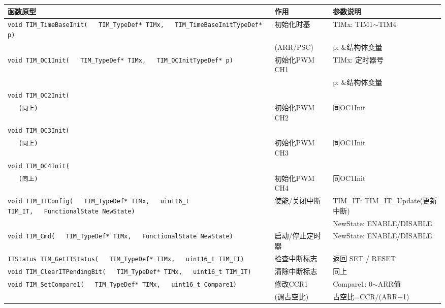 \documentclass[10pt,a4paper,oneside]{ctexart}
\begin{document}
\begin{center}
\begin{tabular}{@{}p{5.5cm}p{2.2cm}p{3.3cm}@{}}
    \toprule
    \textbf{函数原型} & \textbf{作用} & \textbf{参数说明} \\
    \midrule
    \texttt{void TIM\_TimeBaseInit(}\newline\texttt{~~~TIM\_TypeDef* TIMx,}\newline\texttt{~~~TIM\_TimeBaseInitTypeDef* p)} & 初始化时基 & TIMx: TIM1$\sim$TIM4 \\
     & (ARR/PSC) & p: \&结构体变量 \\
    \midrule
    \texttt{void TIM\_OC1Init(}\newline\texttt{~~~TIM\_TypeDef* TIMx,}\newline\texttt{~~~TIM\_OCInitTypeDef* p)} & 初始化PWM CH1 & TIMx: 定时器号 \\
     &  & p: \&结构体变量 \\
    \midrule
    \texttt{void TIM\_OC2Init(}\\\texttt{~~~(同上)} & 初始化PWM CH2 & 同OC1Init \\
    \texttt{void TIM\_OC3Init(}\\\texttt{~~~(同上)} & 初始化PWM CH3 & 同OC1Init \\
    \texttt{void TIM\_OC4Init(}\\\texttt{~~~(同上)} & 初始化PWM CH4 & 同OC1Init \\
    \midrule
    \texttt{void TIM\_ITConfig(}\newline\texttt{~~~TIM\_TypeDef* TIMx,}\newline\texttt{~~~uint16\_t TIM\_IT,}\newline\texttt{~~~FunctionalState NewState)} & 使能/关闭中断 & TIM\_IT: TIM\_IT\_Update(更新中断) \\
     &  & NewState: ENABLE/DISABLE \\
    \midrule
    \texttt{void TIM\_Cmd(}\newline\texttt{~~~TIM\_TypeDef* TIMx,}\newline\texttt{~~~FunctionalState NewState)} & 启动/停止定时器 & NewState: ENABLE/DISABLE \\
    \midrule
    \texttt{ITStatus TIM\_GetITStatus(}\newline\texttt{~~~TIM\_TypeDef* TIMx,}\newline\texttt{~~~uint16\_t TIM\_IT)} & 检查中断标志 & 返回 SET / RESET \\
    \midrule
    \texttt{void TIM\_ClearITPendingBit(}\newline\texttt{~~~TIM\_TypeDef* TIMx,}\newline\texttt{~~~uint16\_t TIM\_IT)} & 清除中断标志 & 同上 \\
    \midrule
    \texttt{void TIM\_SetCompare1(}\newline\texttt{~~~TIM\_TypeDef* TIMx,}\newline\texttt{~~~uint16\_t Compare1)} & 修改CCR1 & Compare1: 0$\sim$ARR值 \\
     & (调占空比) & 占空比=CCR/(ARR+1) \\
    \bottomrule
\end{tabular}
\end{center}
\end{document}
